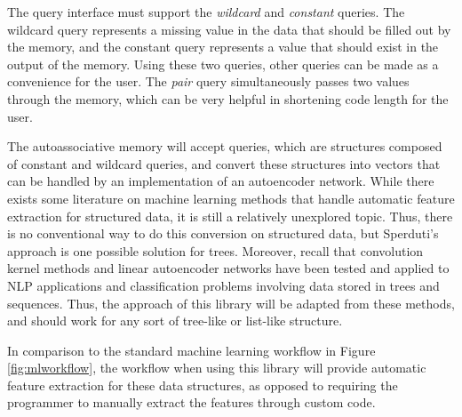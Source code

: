 \documentclass{sig-alternate}
\begin{document}
The query interface must support the \textit{wildcard} and \textit{constant} queries. The wildcard
query represents a missing value in the data that should be filled out by the memory, and the constant
query represents a value that should exist in the output of the memory. Using these two queries,
other queries can be made as a convenience for the user. The \textit{pair} query simultaneously
passes two values through the memory, which can be very helpful in shortening code length for the user.

The autoassociative memory will accept queries, which are structures composed of constant and wildcard queries,
and convert these structures into vectors that can be handled by an implementation of an autoencoder
network. While there exists some literature on machine learning methods that handle automatic feature 
extraction for structured data, it is still a relatively unexplored topic. Thus, there is no conventional way to do this conversion on structured data, but
Sperduti's~\cite{sperduti} approach is one possible solution for trees.
Moreover, recall that convolution kernel methods and 
linear autoencoder networks have been tested and applied to NLP applications and classification problems involving data 
stored in trees and sequences. Thus, the approach of this library will be adapted from these methods, and should work for any sort 
of tree-like or list-like structure.



In comparison to the standard machine learning workflow in Figure \ref{fig:mlworkflow}, the workflow
when using this library will provide automatic feature extraction for these data structures, as opposed to
requiring the programmer to manually extract the features through custom code.

\end{document}
